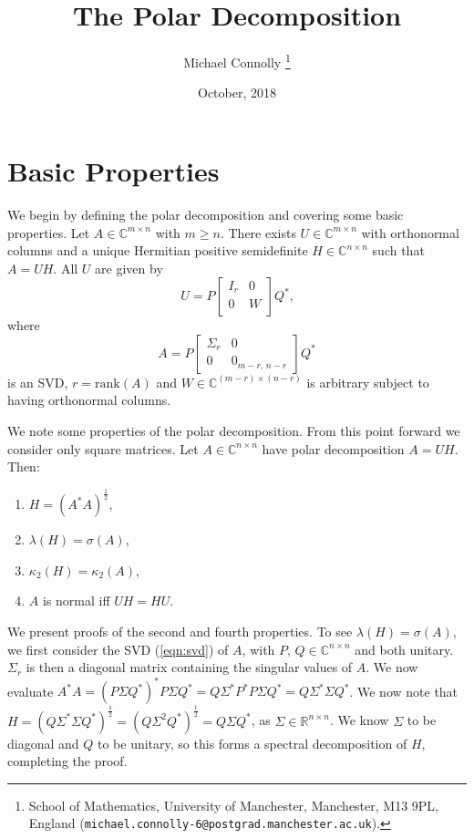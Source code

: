 \documentclass[12pt]{article}
\title{The Polar Decomposition}
\author{Michael Connolly%
        \thanks{%
                School of Mathematics,
                University of Manchester,
                Manchester, M13 9PL, England
                (\texttt{michael.connolly-6@postgrad.manchester.ac.uk}).
               }
}
\date{October, 2018}
\def\R{\mathbb{R}}
\def\C{\mathbb{C}}
\def\nbyn{n \times n}
\def\mbyn{m \times n}
\begin{document}
\maketitle

\section{Basic Properties}

We begin by defining the polar decomposition and covering some basic properties.
Let $A \in \C^{\mbyn}$ with $m \ge n$. There exists $U \in \C^{\mbyn}$ with
orthonormal columns and a unique Hermitian positive semidefinite
$H \in \C^{\nbyn}$ such that $A=UH$.
All $U$ are given by
\begin{equation}
  U=P
  \begin{bmatrix}
    I_r & 0 \\
    0 & W \\
  \end{bmatrix}
  Q^*\text{,}
\end{equation}
where
\begin{equation}\label{eqn:svd}
  A = P \begin{bmatrix} \Sigma_r & 0 \\ 0 & 0_{m-r\text{, } n-r}\end{bmatrix} Q^*
\end{equation}
is an SVD, $r=\mathrm{rank}(A)$ and $W \in \C^{(m-r)\times (n-r)}$
is arbitrary subject to having orthonormal columns.

We note some properties of the polar decomposition.
From this point forward we consider only square matrices.
Let $A \in \C^{\nbyn}$
have polar decomposition $A=UH$. Then:
\begin{enumerate}
\item $H=(A^*A)^{\frac{1}{2}}$,
\item $\lambda (H) = \sigma(A)$,
\item $\kappa_2(H) = \kappa_2(A)$,
\item $A$ is normal iff $UH=HU$.
\end{enumerate}

We present proofs of the second and fourth properties.
To see $\lambda(H) = \sigma(A)$, we first consider the SVD
(\ref{eqn:svd}) of $A$,
with $P\text{, } Q \in \C^{\nbyn}$ and both unitary. $\Sigma_r$ is then a
diagonal matrix containing the singular values of $A$. We now evaluate
$A^*A = (P\Sigma Q^*)^*P\Sigma Q^* = Q\Sigma^* P^* P\Sigma Q^* = Q \Sigma^*
\Sigma Q^*$. We now note that
$H = ( Q \Sigma^* \Sigma Q^*)^{\frac{1}{2}} = ( Q \Sigma^2 Q^*)^{\frac{1}{2}}= Q
\Sigma Q^*$, as $\Sigma \in \R^{\nbyn}$. We know $\Sigma$ to be diagonal and $Q$
to be unitary, so this forms a spectral decomposition of $H$, completing the
proof.
\end{document}
